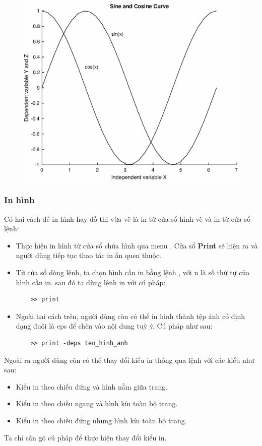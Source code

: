\documentclass[12pt,a4paper]{article}
\begin{document}
\begin{itemize}
\begin{center}
\begin{figure}[H]
\begin{center}
		\includegraphics[scale=0.6]{hinhtieuluan/dothi12}
	\end{center}
		\caption{}
		\label{refdothi12}
	\end{figure}
\end{center}
\end{itemize}
\subsubsection{In hình}
Có hai cách để in hình hay đồ thị vừa vẽ là in từ cửa sổ hình vẽ  và in từ cửa sổ lệnh:
\begin{itemize}
	\item Thực hiện in hình từ cửa sổ chứa hình qua menu . Cửa sổ \textbf{Print} sẽ hiện ra và người dùng tiếp tục thao tác in ấn quen thuộc.
	\item Từ cửa sổ dòng lệnh, ta chọn hình cần in bằng lệnh , với n là số thứ tự của hình cần in. sau đó ta dùng lệnh in với cú pháp:
\begin{lstlisting}
	>> print
\end{lstlisting}
	\item Ngoài hai cách trên, người dùng còn có thể in hình thành tệp ảnh có định dạng đuôi là eps để chèn vào nội dung tuỳ ý. Cú pháp như sau:
\begin{lstlisting}
	>> print -deps ten_hinh_anh
\end{lstlisting}
\end{itemize}
Ngoài ra người dùng còn có thể thay đổi kiểu in thông qua lệnh  với các kiểu như sau:
\begin{itemize}
	\item Kiểu  in theo chiều đứng và hình nằm giữa trang.
	\item Kiểu  in theo chiều ngang và hình kín toàn bộ trang.
	\item Kiểu  in theo chiều đứng nhưng hình kín toàn bộ trang.
\end{itemize}
Ta chỉ cần gõ cú pháp  để thực hiện thay đổi kiểu in.
\end{document}
